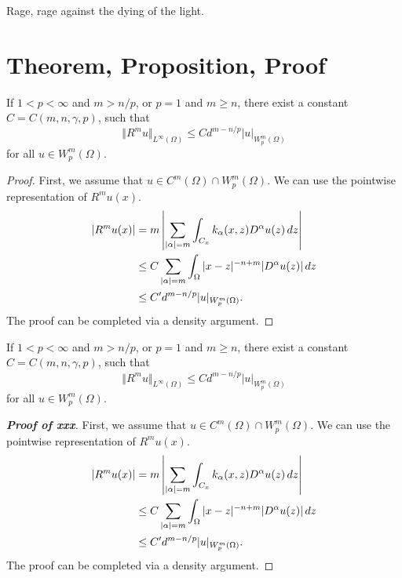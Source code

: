 \documentclass[fontset=none]{ctexart}
\begin{document}
Rage, rage against the dying of the light.

\section{Theorem, Proposition, Proof}

\begin{theorem}
    If $1<p<\infty$ and $m > n/p$, or $p=1$ and $m \ge n$, there exist a constant $C = C(m,n,\gamma,p)$, such that
    \begin{equation*}
        \Vert R^m u \Vert_{L^\infty(\Omega)} \le C d^{m-n/p} |u|_{W^m_p(\Omega)}
    \end{equation*}
    for all $u \in W^m_p(\Omega)$.
\end{theorem}
\begin{proof}
    First, we assume that $u \in C^m(\Omega) \cap W^m_p(\Omega)$. We can use the pointwise representation of $R^mu(x)$.
    \begin{align*}
        |R^mu(x)| ={} & m \left| \sum_{|\alpha| = m} \int_{C_x} k_{\alpha}(x,z) D^\alpha u(z)\,dz \right| \notag \\
        \le{}         & C \sum_{|\alpha|=m} \int_{\Omega} |x-z|^{-n+m} |D^\alpha u(z)|\,dz \notag                \\
        \le{}         & C' d^{m-n/p} |u|_{W^m_p(\Omega)}.
    \end{align*}
    The proof can be completed via a density argument.
\end{proof}

\begin{theorem}[xxx]
    If $1<p<\infty$ and $m > n/p$, or $p=1$ and $m \ge n$, there exist a constant $C = C(m,n,\gamma,p)$, such that
    \begin{equation*}
        \Vert R^m u \Vert_{L^\infty(\Omega)} \le C d^{m-n/p} |u|_{W^m_p(\Omega)}
    \end{equation*}
    for all $u \in W^m_p(\Omega)$.
\end{theorem}
\begin{proof}[\upshape\bfseries Proof of xxx]
    First, we assume that $u \in C^m(\Omega) \cap W^m_p(\Omega)$. We can use the pointwise representation of $R^mu(x)$.
    \begin{align*}
        |R^mu(x)| ={} & m \left| \sum_{|\alpha| = m} \int_{C_x} k_{\alpha}(x,z) D^\alpha u(z)\,dz \right| \notag \\
        \le{}         & C \sum_{|\alpha|=m} \int_{\Omega} |x-z|^{-n+m} |D^\alpha u(z)|\,dz \notag                \\
        \le{}         & C' d^{m-n/p} |u|_{W^m_p(\Omega)}.
    \end{align*}
    The proof can be completed via a density argument.
\end{proof}
\end{document}
